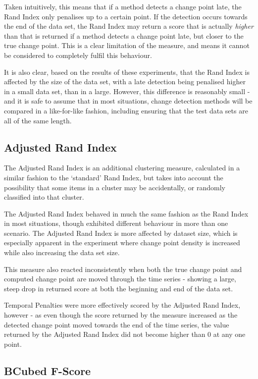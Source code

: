 \documentclass{uvamscse}	%
\begin{document}
Taken intuitively, this means that if a method detects a change point late, the Rand Index only penalises up to a certain point. If the detection occurs towards the end of the data set, the Rand Index may return a score that is actually \emph{higher} than that is returned if a method detects a change point late, but closer to the true change point. This is a clear limitation of the measure, and means it cannot be considered to completely fulfil this behaviour.

It is also clear, based on the results of these experiments, that the Rand Index is affected by the size of the data set, with a late detection being penalised higher in a small data set, than in a large. However, this difference is reasonably small - and it is safe to assume that in most situations, change detection methods will be compared in a like-for-like fashion, including ensuring that the test data sets are all of the same length.

\subsection{Adjusted Rand Index}

The Adjusted Rand Index is an additional clustering measure, calculated in a similar fashion to the `standard' Rand Index, but takes into account the possibility that some items in a cluster may be accidentally, or randomly classified into that cluster.

The Adjusted Rand Index behaved in much the same fashion as the Rand Index in most situations, though exhibited different behaviour in more than one scenario. The Adjusted Rand Index is more affected by dataset size, which is especially apparent in the experiment where change point density is increased while also increasing the data set size.

This measure also reacted inconsistently when both the true change point and computed change point are moved through the time series - showing a large, steep drop in returned score at both the beginning and end of the data set.

Temporal Penalties were more effectively scored by the Adjusted Rand Index, however - as even though the score returned by the measure increased as the detected change point moved towards the end of the time series, the value returned by the Adjusted Rand Index did not become higher than 0 at any one point.

\subsection{BCubed F-Score}
\end{document}
